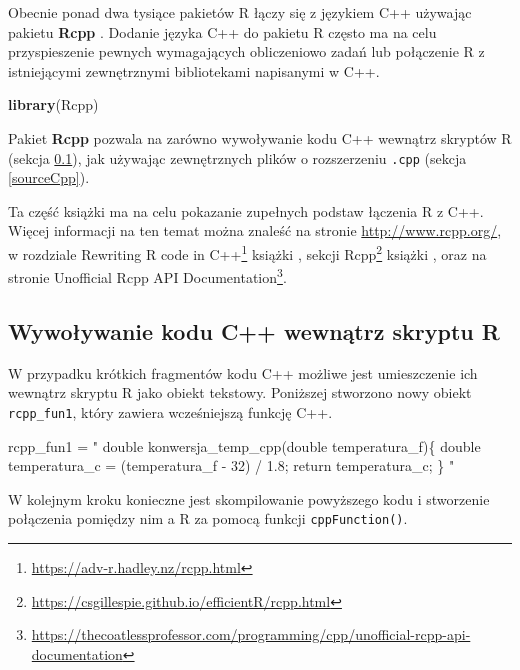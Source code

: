 \documentclass[paper=6in:9in,pagesize=pdftex,headinclude=on,footinclude=on,10pt]{scrbook}
\newenvironment{Shaded}{\begin{snugshade}}{\end{snugshade}}
\newcommand{\KeywordTok}[1]{\textcolor[rgb]{0.13,0.29,0.53}{\textbf{#1}}}
\newcommand{\NormalTok}[1]{#1}
\newcommand{\StringTok}[1]{\textcolor[rgb]{0.31,0.60,0.02}{#1}}
\DeclareRobustCommand{\href}[2]{#2\footnote{\url{#1}}}
\begin{document}
Obecnie ponad dwa tysiące pakietów R łączy się z językiem C++ używając pakietu \textbf{Rcpp} \citep{R-Rcpp}.
Dodanie języka C++ do pakietu R często ma na celu przyspieszenie pewnych wymagających obliczeniowo zadań lub połączenie R z istniejącymi zewnętrznymi bibliotekami napisanymi w C++.

\begin{Shaded}
\begin{Highlighting}[]
\KeywordTok{library}\NormalTok{(Rcpp)}
\end{Highlighting}
\end{Shaded}

Pakiet \textbf{Rcpp} pozwala na zarówno wywoływanie kodu C++ wewnątrz skryptów R (sekcja \ref{cppFunction}), jak używając zewnętrznych plików o rozszerzeniu \texttt{.cpp} (sekcja \ref{sourceCpp}).

Ta część książki ma na celu pokazanie zupełnych podstaw łączenia R z C++.
Więcej informacji na ten temat można znaleść na stronie \url{http://www.rcpp.org/}, w \href{https://adv-r.hadley.nz/rcpp.html}{rozdziale Rewriting R code in C++} książki \citet{wickham2014advanced}, \href{https://csgillespie.github.io/efficientR/rcpp.html}{sekcji Rcpp} książki \citet{gillespie2016efficient}, oraz na stronie \href{https://thecoatlessprofessor.com/programming/cpp/unofficial-rcpp-api-documentation}{Unofficial Rcpp API Documentation}.

\hypertarget{cppFunction}{%
\subsection{Wywoływanie kodu C++ wewnątrz skryptu R}\label{cppFunction}}

W przypadku krótkich fragmentów kodu C++ możliwe jest umieszczenie ich wewnątrz skryptu R jako obiekt tekstowy.
Poniższej stworzono nowy obiekt \texttt{rcpp\_fun1}, który zawiera wcześniejszą funkcję C++.

\begin{Shaded}
\begin{Highlighting}[]
\NormalTok{rcpp_fun1 =}\StringTok{ "}
\StringTok{double konwersja_temp_cpp(double temperatura_f)\{}
\StringTok{  double temperatura_c = (temperatura_f - 32) / 1.8;}
\StringTok{  return temperatura_c;}
\StringTok{\}}
\StringTok{"}
\end{Highlighting}
\end{Shaded}

W kolejnym kroku konieczne jest skompilowanie powyższego kodu i stworzenie połączenia pomiędzy nim a R za pomocą funkcji \texttt{cppFunction()}.
\end{document}
